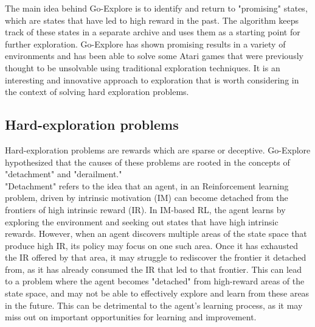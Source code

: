 \documentclass[runningheads]{llncs}%
\begin{document}
The main idea behind Go-Explore is to identify and return to "promising" states, which are states that have led to high reward in the past. The algorithm keeps track of these states in a separate archive and uses them as a starting point for further exploration. Go-Explore has shown promising results in a variety of environments and has been able to solve some Atari games that were previously thought to be unsolvable using traditional exploration techniques. It is an interesting and innovative approach to exploration that is worth considering in the context of solving hard exploration problems.

\subsection{Hard-exploration problems}

Hard-exploration problems are rewards which are sparse or deceptive. Go-Explore hypothesized that the causes of these problems are rooted in the concepts of "detachment" and "derailment."\\

"Detachment" refers to the idea that an agent, in an Reinforcement learning problem, driven by intrinsic motivation (IM) can become detached from the frontiers of high intrinsic reward (IR). In IM-based RL, the agent learns by exploring the environment and seeking out states that have high intrinsic rewards. However, when an agent discovers multiple areas of the state space that produce high IR, its policy may focus on one such area. Once it has exhausted the IR offered by that area, it may struggle to rediscover the frontier it detached from, as it has already consumed the IR that led to that frontier. This can lead to a problem where the agent becomes "detached" from high-reward areas of the state space, and may not be able to effectively explore and learn from these areas in the future. This can be detrimental to the agent's learning process, as it may miss out on important opportunities for learning and improvement.\\
\end{document}
